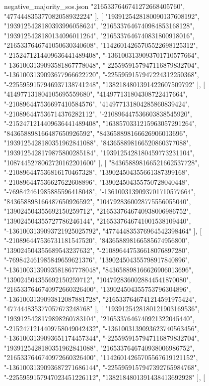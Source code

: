 \begin{filecontents*}[overwrite]{negative_majority_sos.json}
    "2165337646741272668405760",
    "477444835377082058932224"
   ],
   [
    "1939125428180090137608192",
    "1939125428180393996058624",
    "2165337646740984853168128",
    "1939125428180134096011264",
    "2165337646740831800918016",
    "2165337646741050630340608",
    "11426014265705522698125312",
    "-2152471214409636441489408",
    "-1361003139093701710577664",
    "-1361003139093581867778048",
    "-2255959157947116879832704",
    "-1361003139093677966622720",
    "-2255959157947224312250368",
    "-2255959157946937138741248",
    "1382184801391422607509792"
   ],
   [
    "414977131804105695559680",
    "414977131804308722417664",
    "-210896447536697410584576",
    "414977131804285860839424",
    "-210896447536714376282112",
    "-210896447536603838545920",
    "-2152471214409636441489408",
    "1638570331215963057291264",
    "843658898166487650926592",
    "843658898166626906013696",
    "1939125428180351962841088",
    "843658898166520860377088",
    "1939125428179875800285184",
    "1939125428180459773231104",
    "1087445278062720162201600"
   ],
   [
    "843658898166521662537728",
    "-210896447536816170467328",
    "139024504355661387399168",
    "-210896447536627622608896",
    "139024504355750728040448",
    "-769842461985885596418048",
    "-1361003139093701710577664",
    "843658898166487650926592",
    "1047928360028775556055040",
    "139024504355692150259712",
    "2165337646740938006986752",
    "139024504355727786246144",
    "2165337646741001538109440",
    "-1361003139093721925025792",
    "477444835376964542398464"
   ],
   [
    "-210896447536731181547520",
    "843658898166585674956800",
    "139024504355689543237632",
    "-210896447536618076897280",
    "-769842461985849659621376",
    "139024504355798917840896",
    "-1361003139093581867778048",
    "843658898166626906013696",
    "139024504355692150259712",
    "1047928360028844541870080",
    "2165337646740972660326400",
    "139024504355753796304896",
    "-1361003139093812087881728",
    "2165337646741214591975424",
    "477444835377057673248768"
   ],
   [
    "1939125428180121903169536",
    "1939125428179898260783104",
    "2165337646740921322045440",
    "-2152471214409758049042432",
    "-1361003139093623740563456",
    "-1361003139093651174457344",
    "-2255959157947116879832704",
    "1939125428180351962841088",
    "2165337646740938006986752",
    "2165337646740972660326400",
    "11426014265705567619121152",
    "-1361003139093687271686144",
    "-2255959157947392765984768",
    "-2255959157947023451226112",
    "1382184801391438413692928"
   ],
   [

\end{filecontents*}
